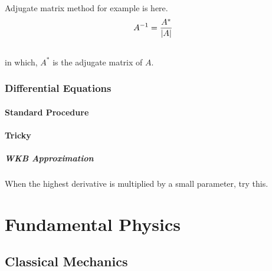 \documentclass[letterpaper,10pt,english]{sphinxmanual}
\begin{document}
Adjugate matrix method for example is here.
\begin{gather}
\begin{split}A^{-1} = \frac{A^*}{|A|}\end{split}\notag\\\begin{split}\end{split}\notag
\end{gather}
in which, $A^*$ is the adjugate matrix of $A$.


\subsection{Differential Equations}
\label{math:differential-equations}

\subsubsection{Standard Procedure}
\label{math:standard-procedure}

\subsubsection{Tricky}
\label{math:tricky}

\paragraph{WKB Approximation}
\label{math:wkb-approximation}
When the highest derivative is multiplied by a small parameter, try this.


\chapter{Fundamental Physics}
\label{index:fundamental-physics}

\section{Classical Mechanics}
\label{ClassicalMechanics:classical-mechanics}\label{ClassicalMechanics::doc}
\end{document}
